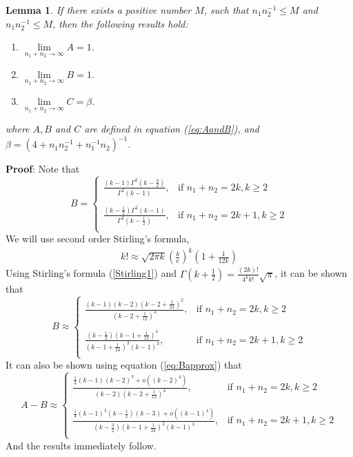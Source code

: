 \documentclass[12pt, a4paper]{article}
\newtheorem{lemma}{Lemma}
\begin{document}
	\begin{lemma}\label{lemmaLimit}
	If there exists a positive number $M$, such that  $n_1n_2^{-1}\leq M$ and $n_1n_2^{-1}\leq M$, then the following results hold:
		\begin{enumerate}
			\item $\lim\limits_{n_1 + n_2\rightarrow \infty} A = 1$.
			\item $\lim\limits_{n_1 + n_2\rightarrow \infty} B = 1$.
			\item $\lim\limits_{n_1 + n_2\rightarrow \infty} C = \beta.$
		\end{enumerate}
	where  $A, B$ and $C$ are defined in equation (\ref{eq:AandB}), and $\beta= (4 + n_1n_2^{-1} + n_1^{-1}n_2)^{-1}$. 
	\end{lemma}
	\textbf{Proof}: Note that 
	\begin{equation}
	B = 
	\begin{cases}
	\frac{(k-1)\Gamma^2(k- \frac{3}{2})}{\Gamma^2(k-1)},& \text{if } n_1 + n_2 = 2k, k\geq 2 \\
	~\\
	 \frac{(k-\frac{1}{2})\Gamma^2(k- 1)}{\Gamma^2(k-\frac{1}{2})},& \text{if } n_1 + n_2 = 2k+1, k\geq 2 \\
	\end{cases}
	\end{equation}
	We will use second order Stirling's formula,
	\begin{align}\label{Stirling1}
		k! \approx \sqrt{2\pi k}\left(\frac{k}{e}\right)^k(1 + \frac{1}{12k})
	\end{align}
	Using Stirling's formula (\ref{Stirling1}) and  $\Gamma(k + \frac{1}{2}) =
	\frac{(2k)!}{4^kk!}\sqrt{\pi}$, it can be shown that 
	\begin{equation}\label{eq:Bapprox}
			B \approx  
		\begin{cases}
			\frac{(k-1)(k-2)(k-2 + \frac{1}{24})^2}{(k-2 + \frac{1}{12})^4},& \text{if } n_1 + n_2 = 2k, k\geq 2 \\
			  ~\\
			\frac{(k-\frac{1}{2})(k - 1 + \frac{1}{12})^4}{(k-1+ \frac{1}{24})^2(k-1)^3},& \text{if } n_1 + n_2 = 2k+1, k\geq 2 \\
		\end{cases}
	\end{equation}
	It can also be shown using equation (\ref{eq:Bapprox}) that
	\begin{equation}\label{eq:AminusB}
		A- B \approx  
		\begin{cases}
		\frac{\frac{1}{4}(k-1)(k-2)^3 + o((k-2)^4)}{(k-2)(k-2 + \frac{1}{12})^4},& \text{if } n_1 + n_2 = 2k, k\geq 2 \\
		~\\
		\frac{\frac{1}{4}(k-1)^3(k-\frac{1}{2})(k-3) + o((k-1)^4)}{(k-\frac{3}{2})(k-1+ \frac{1}{24})^2(k-1)^3},& \text{if } n_1 + n_2 = 2k+1, k\geq 2 \\
		\end{cases}
	\end{equation}
	And the results immediately follow.
	
\end{document}
